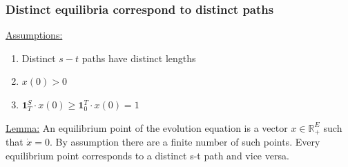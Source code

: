 \documentclass[	hyperref={pdfpagelabels=false}, xcolor=dvipsnames,
		11pt]{beamer}
\begin{document}
\begin{frame}
    \frametitle{Distinct equilibria correspond to distinct paths} 

	\begin{block}{\underline{Assumptions:}}
	 \begin{enumerate}
	 \item Distinct $s-t$ paths have distinct lengths
	 \item $x(0) > 0$
	 \item $\textbf{1}^{S}_{T} \cdot x(0) \ge \textbf{1}^{T}_{0} \cdot x(0) = 1 $
	\end{enumerate}
	\end{block}

	


	\begin{alertblock}{\underline{Lemma:} }
	An equilibrium point of the evolution equation is a vector $x \in \mathbb{R}_{+}^{E}$ such that $\dot x = 0$. By assumption there are a finite
        number of such points. Every equilibrium point corresponds to a distinct s-t path and vice versa.
	\end{alertblock}


	

	

\end{frame}

\end{document}
